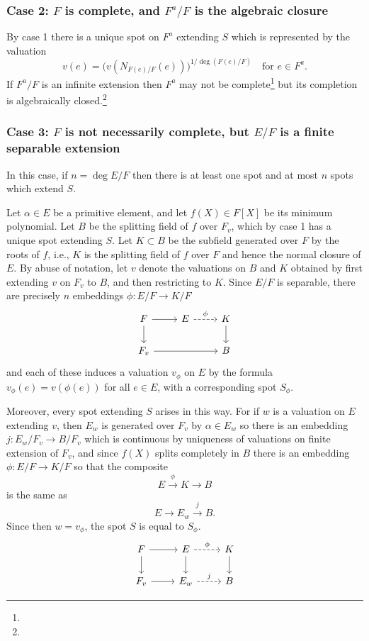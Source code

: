 \documentclass[10pt]{article}
\theoremstyle{definition}
\def\fnfotw{}
\def\fnfoth{}
\begin{document}
\subsubsection[Case 2]{Case 2: $F$ is complete, and $F^a/F$ is the algebraic closure}
\label{4.2.2}

By case 1 there is a unique spot on $F^a$ extending $S$ which is represented by the valuation
\[
v(e) = \bigl(
v(N_{F(e)/F}(e))
\bigr)^{1/\deg(F(e)/F)}
\quad
\text{for $e \in F^a$.}
\]
If $F^a/F$ is an infinite extension then $F^a$ may not be complete\footnote{\fnfotw} but its completion is algebraically closed.\footnote{\fnfoth}


\subsubsection[Case 3]{Case 3: $F$ is not necessarily complete, but $E/F$ is a finite separable extension}
\label{4.2.3}

In this case, if $n = \deg E/F$ then there is at least one spot and at most $n$ spots which extend $S$.

Let $\alpha \in E$ be a primitive element, and let $f(X) \in F[X]$ be its minimum polynomial.
Let $B$ be the splitting field of $f$ over $F_v$, which by case 1 has a unique spot extending $S$.
Let $K \subset B$ be the subfield generated over $F$ by the roots of $f$, i.e., $K$ is the splitting field of $f$ over $F$ and hence the normal closure of $E$.
By abuse of notation, let $v$ denote the valuations on $B$ and $K$ obtained by first extending $v$ on $F_v$ to $B$, and then restricting to $K$.
Since $E/F$ is separable, there are precisely $n$ embeddings $\phi : E/F \to K/F$ 
\[
\begin{tikzcd}
F \ar[d] \ar[r] & E \ar[r, dashed, "\phi"] & K \ar[d]
\\
F_v \ar[rr] & & B
\end{tikzcd}
\]
and each of these induces a valuation $v_\phi$ on $E$ by the formula $v_\phi(e) = v(\phi(e))$ for all $e \in E$, with a corresponding spot $S_\phi$.

Moreover, every spot extending $S$ arises in this way.
For if $w$ is a valuation on $E$ extending $v$, then $E_w$ is generated over $F_v$ by $\alpha \in E_w$ so there is an embedding $j : E_w/F_v \to B/F_v$ which is continuous by uniqueness of valuations on finite extension of $F_v$, and since $f(X)$ splits completely in $B$ there is an embedding $\phi : E/F \to K/F$ so that the composite 
\[
E \stackrel{\phi}{\longrightarrow} K \longrightarrow B
\]
is the same as 
\[
E \longrightarrow E_w \stackrel{j}{\longrightarrow} B.
\]
Since then $w = v_\phi$, the spot $S$ is equal to $S_\phi$.
\[
\begin{tikzcd}
F \ar[d] \ar[r] & E \ar[r, dashed, "\phi"] \ar[d] & K \ar[d]
\\
F_v \ar[r] & E_w \ar[r, dashed, "j"] & B
\end{tikzcd}
\]
\end{document}

